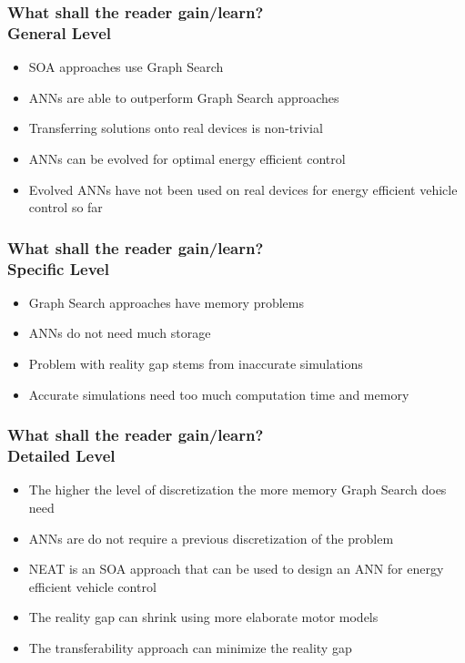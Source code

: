 \documentclass[8pt]{beamer}
\begin{document}
\begin{frame}
\frametitle{What shall the reader gain/learn?\\General Level}
\begin{itemize}
	\item SOA approaches use Graph Search 
	\item ANNs are able to outperform Graph Search approaches
	\item Transferring solutions onto real devices is non-trivial
	\item ANNs can be evolved for optimal energy efficient control
	\item Evolved ANNs have not been used on real devices for energy efficient vehicle control so far
\end{itemize}
\end{frame}

\begin{frame}
\frametitle{What shall the reader gain/learn?\\Specific Level}
\begin{itemize}
	\item Graph Search approaches have memory problems
	\item ANNs do not need much storage
	\item Problem with reality gap stems from inaccurate simulations
	\item Accurate simulations need too much computation time and memory
\end{itemize}
\end{frame}

\begin{frame}
\frametitle{What shall the reader gain/learn?\\Detailed Level}
\begin{itemize}
	\item The higher the level of discretization the more memory Graph Search does need
	\item ANNs are do not require a previous discretization of the problem
	\item NEAT is an SOA approach that can be used to design an ANN for energy efficient vehicle control
	\item The reality gap can shrink using more elaborate motor models
	\item The transferability approach can minimize the reality gap
\end{itemize}
\end{frame}
\end{document}
